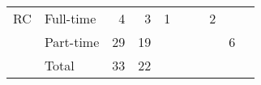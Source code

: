 \begin{table}[!htb]
\begin{list}{}{%
			\setlength{\leftmargin}{-2.5cm}
			\setlength{\rightmargin}{1.5cm}}
\begin{tabular}{*{2}{l}*{2}{r}*{6}{S}}
			\bottomrule
            		RC & Full-time & 4      & 3                                                                                      & 1                 &                    &                 & 2                   &                     &                     \\
			           & Part-time & 29     & 19                                                                                     &                   &                    &                 &                     & 6                   &                     \\
			           & Total     & 33     & 22                                                                                     &                   &                    &                 &                     &                     &                     \\
			\bottomrule
		\end{tabular}
	\end{list}
\end{table}

